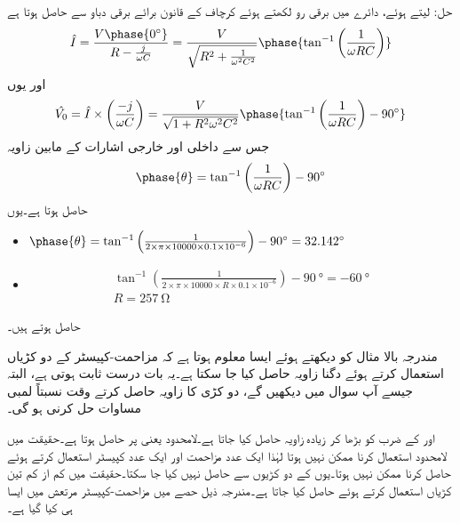 حل:
 لیتے ہوئے، دائرے میں برقی رو  لکھتے ہوئے کرچاف کے قانون برائے برقی دباو سے حاصل ہوتا ہے
\begin{align*}
\hat{I}=\frac{V \phase{\SI{0}{\degree}}}{R-\frac{j}{\omega C}}=\frac{V }{\sqrt{R^2+\frac{1}{\omega^2 C^2}}}\phase {\tan^{-1} \left(\frac{1}{\omega R C} \right)}
\end{align*}
اور یوں
\begin{align*}
\hat{V_0}= \hat{I} \times \left(\frac{-j}{\omega C} \right)=\frac{V}{\sqrt{1+R^2 \omega^2 C^2}} \phase{\tan^{-1} \left(\frac{1}{\omega R C} \right) -\SI{90}{\degree}}
\end{align*}
جس سے داخلی اور خارجی اشارات کے مابین زاویہ
\begin{align*}
\phase{\theta}={\tan^{-1} \left(\frac{1}{\omega R C} \right) -\SI{90}{ \degree}}
\end{align*}
حاصل ہوتا ہے۔یوں
\begin{itemize}
\item
$\phase{\theta}=\tan^{-1} \left(\frac{1}{2 \times \pi \times 10000 \times 0.1 \times 10^{-6}} \right)-\SI{90}{\degree}=\SI{32.142}{\degree} $
\item
\begin{align*}
\tan^{-1}\left(\frac{1}{2 \times \pi \times 10000 \times R \times 0.1 \times 10^{-6}} \right)-\SI{90}{\degree}=\SI{-60}{\degree}\\
R=\SI{257}{\ohm}
\end{align*}
\end{itemize}
حاصل ہوتے ہیں۔

مندرجہ بالا مثال کو دیکھتے ہوئے ایسا معلوم ہوتا ہے کہ مزاحمت-کپیسٹر کے دو کڑیاں استعمال کرتے ہوئے دگنا زاویہ حاصل کیا جا سکتا ہے۔یہ بات درست ثابت ہوتی ہے، البتہ جیسے آپ سوال  میں دیکھیں گے، دو کڑی  کا زاویہ حاصل کرتے وقت نسبتاً لمبی مساوات حل کرنی ہو گی۔

 اور  کے ضرب  کو بڑھا کر زیادہ زاویہ حاصل کیا جاتا ہے۔لامحدود  یعنی پر  حاصل ہوتا ہے۔حقیقت میں لامحدود  استعمال کرنا ممکن نہیں ہوتا لہٰذا ایک عدد مزاحمت اور ایک عدد کپیسٹر استعمال کرتے ہوئے  حاصل کرنا ممکن نہیں ہوتا۔یوں  کے دو کڑیوں سے  حاصل نہیں کیا جا سکتا۔حقیقت میں کم از کم تین  کڑیاں استعمال کرتے ہوئے  حاصل کیا جاتا ہے۔مندرجہ ذیل حصے میں مزاحمت-کپیسٹر مرتعش میں ایسا ہی کیا گیا ہے۔  


